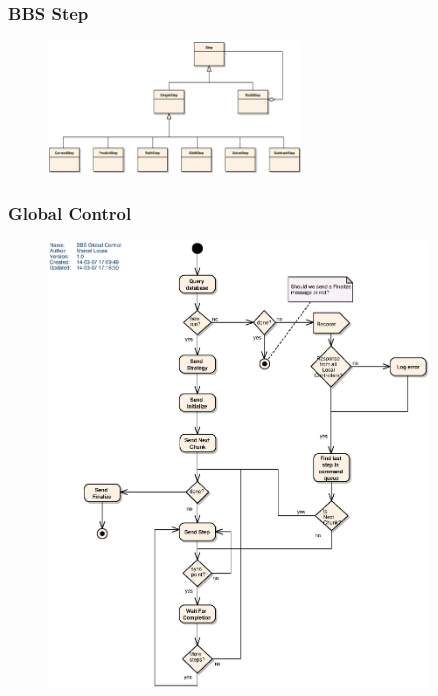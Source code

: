 \documentclass[10pt]{lofar}
\begin{document}
\subsubsection{BBS Step}
\label{subsubsec:design-step}
\begin{figure}[!ht]
\centering
\includegraphics[width=0.6\textwidth]{images/bbs-step-class-diagram}
\end{figure}

\subsubsection{Global Control}
\label{subsubsec:design-global-control}
\begin{figure}[!ht]
\centering
\includegraphics[width=0.9\textwidth]{images/bbs-global-control-activity-diagram}
\end{figure}
\end{document}
